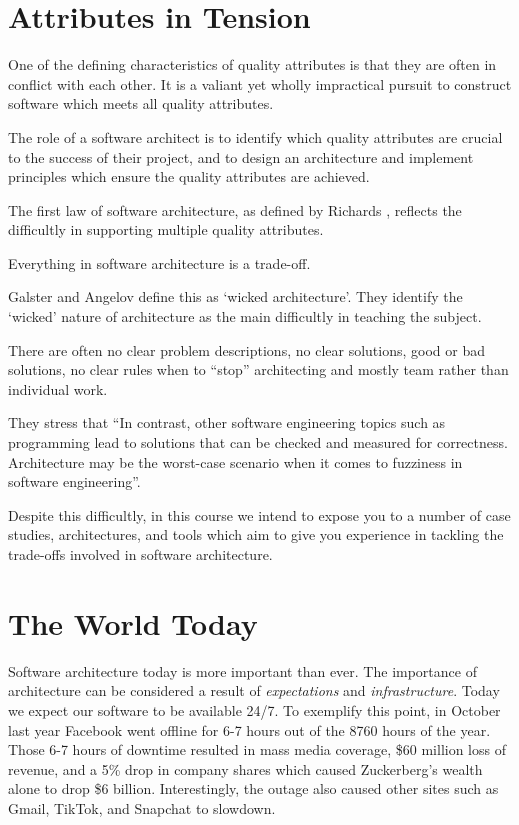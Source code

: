 \section{Attributes in Tension}
One of the defining characteristics of quality attributes is that they are often in conflict with each other.
It is a valiant yet wholly impractical pursuit to construct software which meets all quality attributes.

The role of a software architect is to identify which quality attributes are crucial to the success of their project,
and to design an architecture and implement principles which ensure the quality attributes are achieved.

\filbreak
The first law of software architecture, as defined by Richards \cite{richards2020fundamentals}, reflects the difficultly in supporting multiple quality attributes.

\begin{definition}
Everything in software architecture is a trade-off.
\end{definition}

Galster and Angelov \cite{wicked-architecture} define this as `wicked architecture'.
They identify the `wicked' nature of architecture as the main difficultly in teaching the subject.

\begin{definition}
There are often no clear problem descriptions, no clear solutions, good or bad solutions, no clear rules when to ``stop'' architecting
and mostly team rather than individual work.
\end{definition}

They stress that ``In contrast, other software engineering topics such as programming lead to solutions that can be checked and measured for correctness.
Architecture may be the worst-case scenario when it comes to fuzziness in software engineering''.

Despite this difficultly, in this course we intend to expose you to a number of case studies, architectures,
and tools which aim to give you experience in tackling the trade-offs involved in software architecture.

\section{The World Today}
Software architecture today is more important than ever.
The importance of architecture can be considered a result of \textsl{expectations} and \textsl{infrastructure}.
Today we expect our software to be available 24/7.
To exemplify this point, in October last year Facebook went offline for 6-7 hours out of the 8760 hours of the year.
Those 6-7 hours of downtime resulted in mass media coverage, \$60 million loss of revenue,
and a 5\% drop in company shares which caused Zuckerberg's wealth alone to drop \$6 billion.
Interestingly, the outage also caused other sites such as Gmail, TikTok, and Snapchat to slowdown.

